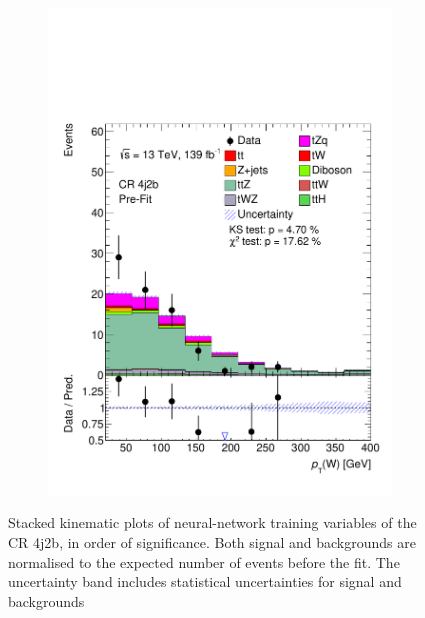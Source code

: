 \begin{figure}[!h]
\begin{subfigure}[b]{0.32\linewidth}
    \includegraphics[width=\linewidth]{ubonn-thesis/Chapters/Chapters_06/Figure/Input_distribution/CR_4j2b_W_pt.pdf} 
  \end{subfigure}%
  \caption{Stacked kinematic plots of neural-network training variables of the CR 4j2b, in order of significance. Both signal and backgrounds are normalised to the expected number of events before the fit. The uncertainty band includes statistical uncertainties for signal and backgrounds}
  \label{fig_control3}
  \end{figure}


